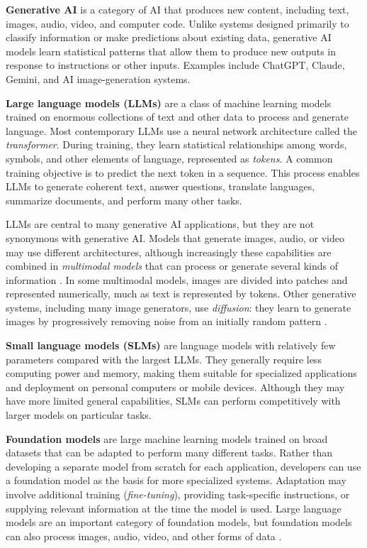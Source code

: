 \documentclass[11pt]{article}
\begin{document}
\textbf{Generative AI} is a category of AI that produces new content,
including text, images, audio, video, and computer code. Unlike
systems designed primarily to classify information or make predictions
about existing data, generative AI models learn statistical patterns
that allow them to produce new outputs in response to instructions
or other inputs. Examples include ChatGPT, Claude, Gemini, and AI
image-generation systems.

\textbf{Large language models (LLMs)} are a class of machine learning
models trained on enormous collections of text and other data to
process and generate language. Most contemporary LLMs use a neural
network architecture called the \emph{transformer}. During training,
they learn statistical relationships among words, symbols, and
other elements of language, represented as \emph{tokens}. A common
training objective is to predict the next token in a sequence.
This process enables LLMs to generate coherent text, answer
questions, translate languages, summarize documents, and perform
many other tasks.

LLMs are central to many generative AI applications, but they are
not synonymous with generative AI. Models that generate images,
audio, or video may use different architectures, although
increasingly these capabilities are combined in \emph{multimodal
models} that can process or generate several kinds of information
\citep{Bommasani2021}.
In some multimodal models, images are divided into patches and represented
numerically, much as text is represented by tokens. Other generative
systems, including many image generators, use \emph{diffusion}: they learn
to generate images by progressively removing noise from an initially
random pattern \citep{Ho2020Diffusion}.

\textbf{Small language models (SLMs)} are language models with relatively few parameters compared with the largest LLMs. They generally require less computing power and memory, making them suitable for specialized applications and deployment on personal computers or mobile devices. Although they may have more limited general capabilities, SLMs can perform competitively with larger models on particular tasks.

\textbf{Foundation models} are large machine learning models
trained on broad datasets that can be adapted to perform many
different tasks. Rather than developing a separate model from
scratch for each application, developers can use a foundation
model as the basis for more specialized systems. Adaptation
may involve additional training (\emph{fine-tuning}), providing
task-specific instructions, or supplying relevant information
at the time the model is used. Large language models are an
important category of foundation models, but foundation
models can also process images, audio, video, and other forms
of data \citep{Bommasani2021}.
\end{document}
